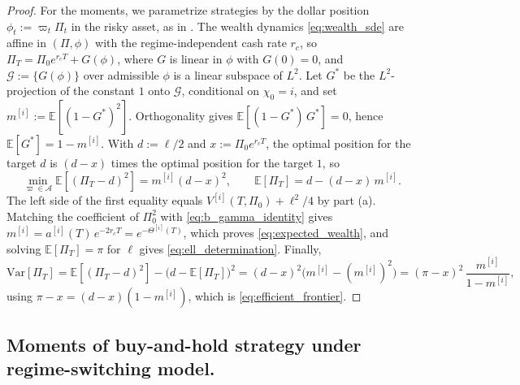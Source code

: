 \documentclass[11pt,a4paper]{article}
\numberwithin{equation}{section}
\newcommand{\E}{\mathbb{E}}
\newcommand{\Var}{\mathrm{Var}}
\begin{document}
\begin{appendices}
\begin{proof}
For the moments, we parametrize strategies by the dollar position $\phi_t := \varpi_t \Pi_t$ in the risky asset, as in \citet{ZhouLi2000}. The wealth dynamics \eqref{eq:wealth_sde} are affine in $(\Pi, \phi)$ with the regime-independent cash rate $r_c$, so $\Pi_T = \Pi_0 e^{r_c T} + G(\phi)$, where $G$ is linear in $\phi$ with $G(0) = 0$, and $\mathcal{G} := \{G(\phi)\}$ over admissible $\phi$ is a linear subspace of $L^2$. Let $G^{*}$ be the $L^2$-projection of the constant $1$ onto $\mathcal{G}$, conditional on $\chi_0 = i$, and set $m^{[i]} := \E[(1 - G^{*})^2]$. Orthogonality gives $\E[(1 - G^{*})\,G^{*}] = 0$, hence $\E[G^{*}] = 1 - m^{[i]}$. With $d := \ell/2$ and $x := \Pi_0 e^{r_c T}$, the optimal position for the target $d$ is $(d - x)$ times the optimal position for the target $1$, so
\begin{equation}\label{eq:projection_moments}
\min_{\varpi \in \mathcal{A}} \E[(\Pi_T - d)^2] = m^{[i]} (d - x)^2, \qquad \E[\Pi_T] = d - (d - x)\, m^{[i]}.
\end{equation}
The left side of the first equality equals $V^{[i]}(T, \Pi_0) + \ell^2/4$ by part (a). Matching the coefficient of $\Pi_0^2$ with \eqref{eq:b_gamma_identity} gives $m^{[i]} = a^{[i]}(T)\, e^{-2r_c T} = e^{-\Theta^{[i]}(T)}$, which proves \eqref{eq:expected_wealth}, and solving $\E[\Pi_T] = \pi$ for $\ell$ gives \eqref{eq:ell_determination}. Finally,
\begin{equation}\label{eq:projection_variance}
\Var[\Pi_T] = \E[(\Pi_T - d)^2] - \big(d - \E[\Pi_T]\big)^2 = (d - x)^2\big(m^{[i]} - (m^{[i]})^2\big) = (\pi - x)^2\, \frac{m^{[i]}}{1 - m^{[i]}},
\end{equation}
using $\pi - x = (d - x)(1 - m^{[i]})$, which is \eqref{eq:efficient_frontier}.
\end{proof}




\subsection{Moments of buy-and-hold strategy under regime-switching model.}\label{app:bh_moments}


\end{appendices}
\end{document}
